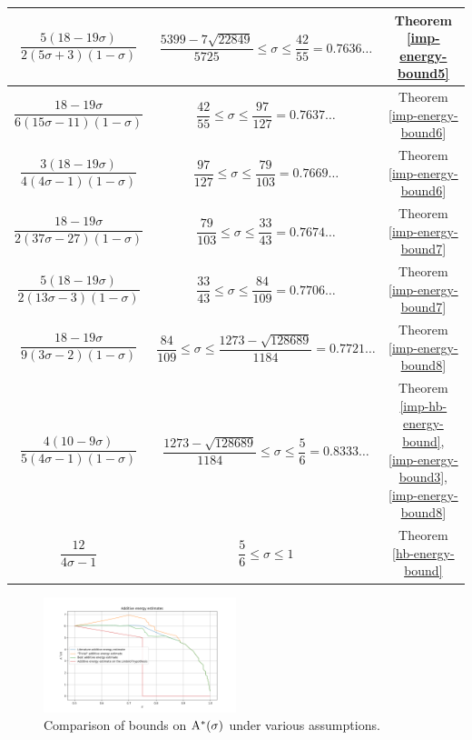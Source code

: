 \begin{table}[ht]
\begin{tabular}{|c|c|c|}
    \hline
    $\dfrac{5(18 - 19\sigma)}{2(5\sigma + 3)(1 - \sigma)}$ & $\dfrac{5399 - 7\sqrt{22849}}{5725} \leq \sigma \le \dfrac{42}{55} = 0.7636\ldots$ & Theorem \ref{imp-energy-bound5}\\
    \hline
    $\dfrac{18 - 19\sigma}{6(15\sigma - 11)(1- \sigma)}$ & $\dfrac{42}{55} \leq \sigma \le \dfrac{97}{127} = 0.7637\ldots$ & Theorem \ref{imp-energy-bound6}\\
    \hline
    $\dfrac{3(18-19\sigma)}{4(4\sigma-1)(1 - \sigma)}$ & $\dfrac{97}{127} \leq \sigma \le \dfrac{79}{103} = 0.7669\ldots$ & Theorem \ref{imp-energy-bound6}\\
    \hline
    $\dfrac{18 - 19\sigma}{2(37\sigma - 27)(1 - \sigma)}$ & $\dfrac{79}{103} \leq \sigma \le \dfrac{33}{43} = 0.7674\ldots$ & Theorem \ref{imp-energy-bound7}\\
    \hline
    $\dfrac{5(18 - 19\sigma)}{2(13\sigma - 3)(1 - \sigma)}$ & $\dfrac{33}{43} \leq \sigma \le \dfrac{84}{109} = 0.7706\ldots$ & Theorem \ref{imp-energy-bound7}\\
    \hline
    $\dfrac{18 - 19\sigma}{9(3\sigma - 2)(1 - \sigma)}$ & $\dfrac{84}{109} \leq \sigma \le \dfrac{1273 - \sqrt{128689}}{1184} = 0.7721\ldots$ & Theorem \ref{imp-energy-bound8}\\
    \hline
    $\dfrac{4(10 - 9\sigma)}{5(4\sigma - 1)(1 - \sigma)}$ & $\dfrac{1273 - \sqrt{128689}}{1184} \leq \sigma \le \dfrac{5}{6} = 0.8333\ldots$ & Theorem \ref{imp-hb-energy-bound}, \ref{imp-energy-bound3}, \ref{imp-energy-bound8}\\
    \hline
    $\dfrac{12}{4\sigma - 1}$ & $\dfrac{5}{6} \leq \sigma \le 1$ & Theorem \ref{hb-energy-bound}\\
    \hline
    \end{tabular}
    \label{zero-density-energy-estimates-table}
\end{table}

\begin{figure}
    \centering
    \includegraphics[width=0.5\textwidth]{chapter/zero_density_energy_estimate.png}
    \caption{Comparison of bounds on $\mathrm{A}^*(\sigma)$ under various assumptions.}
    \label{fig:zero_density_energy_estimate}
\end{figure}


